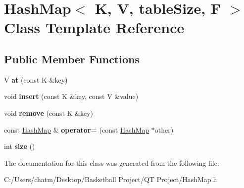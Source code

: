 \hypertarget{class_hash_map}{}\section{Hash\+Map$<$ K, V, table\+Size, F $>$ Class Template Reference}
\label{class_hash_map}
\subsection*{Public Member Functions}
\begin{DoxyCompactItemize}
\item 
\mbox{\label{class_hash_map_a4687b9af9d79c54ffde375bae452491a}} 
V {\bfseries at} (const K \&key)
\item 
\mbox{\label{class_hash_map_a32c4670f4224ac2391ee655a2df60850}} 
void {\bfseries insert} (const K \&key, const V \&value)
\item 
\mbox{\label{class_hash_map_a50add0ae20d4f4f2dc58eb9e2ffdfd65}} 
void {\bfseries remove} (const K \&key)
\item 
\mbox{\label{class_hash_map_a3f36c631554e86898af58a6b490ca648}} 
const \mbox{\hyperlink{class_hash_map}{Hash\+Map}} \& {\bfseries operator=} (const \mbox{\hyperlink{class_hash_map}{Hash\+Map}} $\ast$other)
\item 
\mbox{\label{class_hash_map_a0b30cbc91c80c1b7619729a18ff06ab1}} 
int {\bfseries size} ()
\end{DoxyCompactItemize}


The documentation for this class was generated from the following file\+:\begin{DoxyCompactItemize}
\item 
C\+:/\+Users/chatm/\+Desktop/\+Basketball Project/\+Q\+T Project/Hash\+Map.\+h\end{DoxyCompactItemize}
